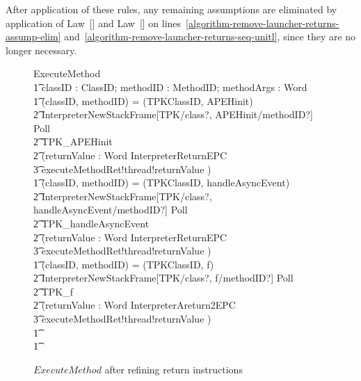 After application of these rules, any remaining assumptions are
eliminated by application of Law~[] and
Law~[] on
lines~\ref{algorithm-remove-launcher-returns-assump-elim}
and~\ref{algorithm-remove-launcher-returns-seq-unitl}, since they are
no longer necessary.

\begin{figure}[tp!]
  \centering
  \begin{circusaction}
    ExecuteMethod \circdef \\
    \t1 \circval classID : ClassID; \circval methodID : MethodID; \circval methodArgs : \seq Word \circspot \\
    \t1 \circif (classID, methodID) = (TPKClassID, APEHinit) \circthen {} \\
    \t2 InterpreterNewStackFrame[TPK/class?, APEHinit/methodID?] \circseq Poll \circseq \\
    \t2 TPK\_APEHinit \circseq \\
    \t2 (\circvar returnValue : Word \circspot \lschexpract InterpreterReturnEPC \rschexpract \circseq \\
    \t3 executeMethodRet!thread!returnValue \then \Skip) \\
    \t1 {} \circelse (classID, methodID) = (TPKClassID, handleAsyncEvent) \circthen {} \\
    \t2 InterpreterNewStackFrame[TPK/class?, handleAsyncEvent/methodID?] \circseq Poll \circseq \\
    \t2 TPK\_handleAsyncEvent \circseq \\
    \t2 (\circvar returnValue : Word \circspot \lschexpract InterpreterReturnEPC \rschexpract \circseq \\
    \t3 executeMethodRet!thread!returnValue \then \Skip) \\
    \t1 {} \circelse (classID, methodID) = (TPKClassID, f) \circthen {} \\
    \t2 InterpreterNewStackFrame[TPK/class?, f/methodID?] \circseq Poll \circseq \\
    \t2 TPK\_f \circseq \\
    \t2 (\circvar returnValue : Word \circspot \lschexpract InterpreterAreturn2EPC \rschexpract \circseq \\
    \t3 executeMethodRet!thread!returnValue \then \Skip) \\
    \t1 {} \cdots {} \\
    \t1 \circfi
  \end{circusaction}
  \caption{$ExecuteMethod$ after refining return instructions}
  \label{efs-ExecutMethod-refined-return-instructions-figure}
\end{figure}

